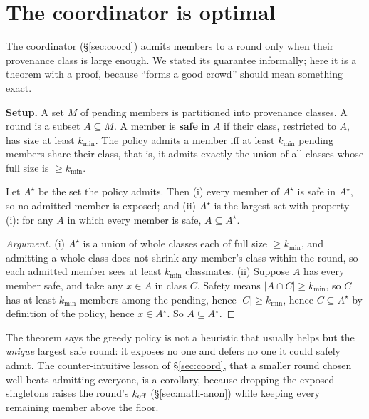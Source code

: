 \documentclass[11pt]{article}
\begin{document}
\section{The coordinator is optimal}
\label{sec:math-coord}

The coordinator (\S\ref{sec:coord}) admits members to a round only when their provenance
class is large enough. We stated its guarantee informally; here it is a theorem with a
proof, because ``forms a good crowd'' should mean something exact.

\textbf{Setup.} A set $M$ of pending members is partitioned into provenance classes. A
round is a subset $A \subseteq M$. A member is \textbf{safe} in $A$ if their class,
restricted to $A$, has size at least $k_{\min}$. The policy  admits a
member iff at least $k_{\min}$ pending members share their class, that is, it admits
exactly the union of all classes whose full size is $\ge k_{\min}$.

\begin{property}
Let $A^{\star}$ be the set the policy admits. Then (i) every member of $A^{\star}$ is safe
in $A^{\star}$, so no admitted member is exposed; and (ii) $A^{\star}$ is the largest set
with property (i): for any $A$ in which every member is safe, $A \subseteq A^{\star}$.
\end{property}

\begin{proof}[Argument]
(i) $A^{\star}$ is a union of whole classes each of full size $\ge k_{\min}$, and admitting
a whole class does not shrink any member's class within the round, so each admitted member
sees at least $k_{\min}$ classmates. (ii) Suppose $A$ has every member safe, and take any
$x \in A$ in class $C$. Safety means $|A \cap C| \ge k_{\min}$, so $C$ has at least
$k_{\min}$ members among the pending, hence $|C| \ge k_{\min}$, hence $C \subseteq
A^{\star}$ by definition of the policy, hence $x \in A^{\star}$. So $A \subseteq
A^{\star}$.
\end{proof}

The theorem says the greedy policy is not a heuristic that usually helps but the
\emph{unique} largest safe round: it exposes no one and defers no one it could safely
admit. The counter-intuitive lesson of \S\ref{sec:coord}, that a smaller round chosen well
beats admitting everyone, is a corollary, because dropping the exposed singletons raises
the round's $k_{\mathrm{eff}}$ (\S\ref{sec:math-anon}) while keeping every remaining member above the
floor.
\end{document}
